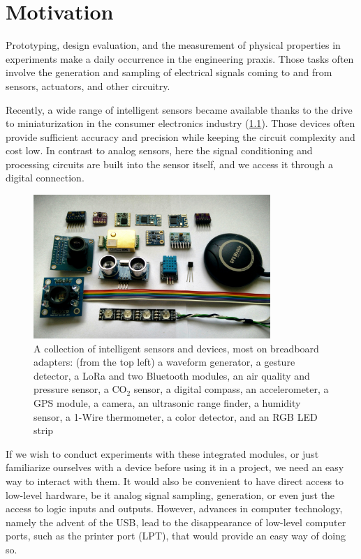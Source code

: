 \chapter{Motivation}

Prototyping, design evaluation, and the measurement of physical properties in experiments make a daily occurrence in the engineering praxis. Those tasks often involve the generation and sampling of electrical signals coming to and from sensors, actuators, and other circuitry.

Recently, a wide range of intelligent sensors became available thanks to the drive to miniaturization in the consumer electronics industry (\cref{fig:some_sensors}). Those devices often provide sufficient accuracy and precision while keeping the circuit complexity and cost low. In contrast to analog sensors, here the signal conditioning and processing circuits are built into the sensor itself, and we access it through a digital connection.

\begin{figure}[H]
	\centering
	\includegraphics[width=0.8\textwidth] {img/inteligent-sensors.jpg}
	\caption[A collection of intelligent sensors and devices]{\label{fig:some_sensors}A collection of intelligent sensors and devices, most on breadboard adapters: (from the top left) a waveform generator, a gesture detector, a LoRa and two Bluetooth modules, an air quality and pressure sensor, a CO$_2$ sensor, a digital compass, an accelerometer, a GPS module, a camera, an ultrasonic range finder, a humidity sensor, a 1-Wire thermometer, a color detector, and an RGB LED strip}
\end{figure}

If we wish to conduct experiments with these integrated modules, or just familiarize ourselves with a device before using it in a project, we need an easy way to interact with them. It would also be convenient to have direct access to low-level hardware, be it analog signal sampling, generation, or even just the access to logic inputs and outputs. However, advances in computer technology, namely the advent of the \gls{USB}, lead to the disappearance of low-level computer ports, such as the printer port (LPT), that would provide an easy way of doing so.

